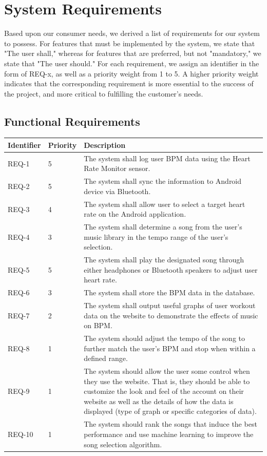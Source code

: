 \documentclass[letterpaper,english]{scrreprt}
\begin{document}
\chapter{System Requirements}
Based upon our consumer needs, we derived a list of requirements for our system to
possess. For features that must be implemented by the system, we state that "The
user shall," whereas for features that are preferred, but not "mandatory," we state
that "The user should." For each requirement, we assign an identifier in the form of
REQ-x, as well as a priority weight from 1 to 5. A higher priority weight indicates
that the corresponding requirement is more essential to the success of the project,
and more critical to fulfilling the customer's needs.

\section{Functional Requirements}
\begin{center}
	\begin{tabular}{|C{2cm}|C{2cm}|C{8cm}|}
		\hline
			Identifier & Priority & Description\\
		\hline
			REQ-1 & 5 &  The system shall log user BPM data using the Heart Rate Monitor sensor.\\
		\hline
			REQ-2 & 5 & The system shall sync the information to Android device via Bluetooth.\\
		\hline
			REQ-3 & 4 & The system shall allow user to select a target heart rate on the Android application.\\
		\hline
			REQ-4 & 3 & The system shall determine a song from the user’s music library in the tempo range of the user’s selection.\\
		\hline
			REQ-5 & 5 & The system shall play the designated song through either headphones or Bluetooth speakers to adjust user heart rate.\\
		\hline
			REQ-6 & 3 & The system shall store the BPM data in the database.\\
		\hline
			REQ-7 & 2 & The system shall output useful graphs of user workout data on the website to demonstrate the effects of music on BPM.\\
		\hline
			REQ-8 & 1 & The system should adjust the tempo of the song to further match the user’s BPM and stop when within a defined range.\\
		\hline
			REQ-9 & 1 & The system should allow the user some control when they use the website. That is, they should be able to customize the look and feel of the account on their website as well as the details of how the data is displayed (type of graph or specific categories of data).\\
		\hline
			REQ-10 & 1 & The system should rank the songs that induce the best performance and use machine learning to improve the song selection algorithm.\\
		\hline
	\end{tabular}
\end{center}
\end{document}

